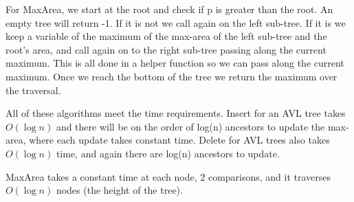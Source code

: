 \documentclass[10pt,a4paper]{article}
\begin{document}
\begin{enumerate}
\begin{enumerate}
For MaxArea, we start at the root and check if p is greater than the root.  An empty tree will return -1. If it is not we call again on the left sub-tree. If it is we keep a variable of the maximum of the max-area of the left sub-tree and the root's area, and call again on to the right sub-tree passing along the current maximum. This is all done in a helper function so we can pass along the current maximum. Once we reach the bottom of the tree we return the maximum over the traversal.

All of these algorithms meet the time requirements. Insert for an AVL tree takes $O(\log n)$ and there will be on the order of log(n) ancestors to update the max-area, where each update takes constant time. Delete for AVL trees also takes 
$O(\log n)$ time, and again there are log(n) ancestors to update. 

MaxArea takes a constant time at each node, 2 comparisons, and it traverses $O(\log n)$ nodes (the height of the tree).
\end{enumerate}
\end{enumerate}
\end{document}
